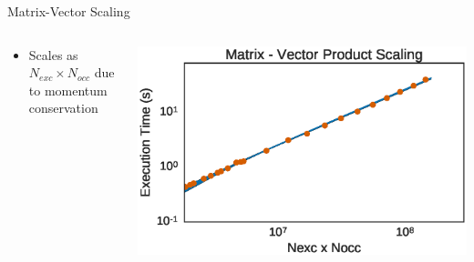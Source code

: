 \documentclass[10pt]{beamer}
\begin{document}
{{{{{{{{{{{{{\begin{frame}{Matrix-Vector Scaling}
	\begin{columns}[c] %
		\begin{column}{.4\textwidth}
			\begin{itemize}
				\item {Scales as $N_{exc} \times  N_{occ}$ due to momentum conservation}
			\end{itemize}				
		\end{column}
		\hfill
		\begin{column}{0.6\textwidth}
		    \begin{overprint}
			    \includegraphics[width=\linewidth]{../images/mvscaling.eps}

			\end{overprint}
		\end{column}	
	\end{columns}
\end{frame}

}}}}}}}}}}}}}
\end{document}
